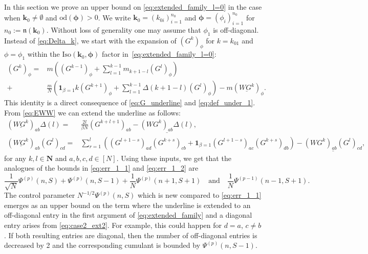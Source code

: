 \documentclass[10pt]{amsart}
\numberwithin{equation}{section}
\begin{document}
In this section we prove an upper bound on \eqref{eq:extended_family_l=0} in the case when $\bm{k}_0\neq\emptyset$ and $\mathrm{od}(\bm{\phi})>0$. We write $\bm{k}_0=(k_{0i})_{i=1}^{n_0}$ and $\bm{\phi}=(\phi_i)_{i=1}^{n_0}$ for $n_0:=\mathfrak{n}(\bm{k}_0)$. Without loss of generality one may assume that $\phi_1$ is off-diagonal. Instead of \eqref{eq:Delta_k}, we start with the expansion of $(G^k)_{\phi}$ for $k=k_{01}$ and $\phi=\phi_1$ within the $\mathrm{Iso}(\bm{k}_0,\bm{\phi})$ factor in~\eqref{eq:extended_family_l=0}:
\begin{equation}
\begin{split}
(G^k)_\phi =& m\left( (G^{k-1})_\phi + \sum_{l=1}^{k-1} m_{k+1-l} (G^{l})_\phi\right)\\
 +&\frac{m}{N} \left( \bm{1}_{\beta=1} k (G^{k+1})_\phi + \sum_{l=1}^{k-1} \Delta(k+1-l) (G^{l})_\phi\right) - m\left(\underline{WG^k}\right)_\phi.
\end{split}
\label{eq:iso_G_expansion}
\end{equation}
This identity is a direct consequence of \eqref{eq:G_underline} and \eqref{eq:def_under_1}. From \eqref{eq:EWW} we can extend the underline as follows:
\begin{align}
(\underline{WG^k})_{ab}\Delta(l)= &\frac{2l}{\beta N} (G^{k+l+1})_{ab} - \underline{(WG^k)_{ab}\Delta(l)},\label{eq:case2_ext1}\\
(\underline{WG^k})_{ab} (G^l)_{cd} = & \sum_{r=1}^l \left((G^{l+1-s})_{ad}(G^{k+s})_{cb} + \bm{1}_{\beta=1}(G^{l+1-s})_{ac}(G^{k+s})_{db}\right) - \underline{(WG^k)_{ab}(G^l)_{cd}},\label{eq:case2_ext2}
\end{align}
for any $k,l\in \mathbf{N}$ and $a,b,c,d\in [N]$. Using these inputs, we get that the analogues of the bounds in \eqref{eq:err_1_1} and \eqref{eq:err_1_2} are
\begin{equation}
\frac{1}{\sqrt{N}}\Psi^{(p)}(n,S) + \Psi^{(p)}(n,S-1) + \frac{1}{N}\Psi^{(p)}(n+1,S+1)\quad \text{and}\quad \frac{1}{N}\Psi^{(p-1)}(n-1,S+1).
\label{eq:case2_ext_terms}
\end{equation}
The control parameter $N^{-1/2}\Psi^{(p)}(n,S)$ which is new compared to \eqref{eq:err_1_1} emerges as an upper bound on the term where the underline is extended to an off-diagonal entry in the first argument of \eqref{eq:extended_family} and a diagonal entry arises from \eqref{eq:case2_ext2}. For example, this could happen for $d=a$, $c\neq b$. If both resulting entries are diagonal, then the number of off-diagonal entries is decreased by 2 and the corresponding cumulant is bounded by $\Psi^{(p)}(n,S-1)$.
\end{document}
